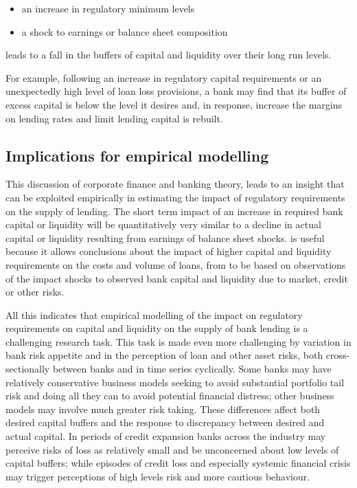 \documentclass[
]{article}
\begin{document}
\begin{itemize}
    \item an increase in regulatory minimum levels
    \item a shock to earnings or balance sheet composition
\end{itemize}

leads to a fall in the buffers of capital and liquidity over their long run levels.

For example, following an increase in regulatory capital requirements or an unexpectedly high level of loan loss provisions, a bank may find that its buffer of excess capital is below the level it desires and, in response, increase the margins on lending rates and limit lending capital is rebuilt.

\hypertarget{implications-for-empirical-modelling-1}{%
\subsection{Implications for empirical modelling}\label{implications-for-empirical-modelling-1}}

This discussion of corporate finance and banking theory, leads to an insight that can be exploited empirically in estimating the impact of regulatory requirements on the supply of lending. The short term impact of an increase in required bank capital or liquidity will be quantitatively very similar to a decline in actual capital or liquidity resulting from earnings of balance sheet shocks. is useful because it allows conclusions about the impact of higher capital and liquidity requirements on the costs and volume of loans, from to be based on observations of the impact shocks to observed bank capital and liquidity due to market, credit or other risks.

All this indicates that empirical modelling of the impact on regulatory requirements on capital and liquidity on the supply of bank lending is a challenging research task. This task is made even more challenging by variation in bank risk appetite and in the perception of loan and other asset risks, both cross-sectionally between banks and in time series cyclically. Some banks may have relatively conservative business models seeking to avoid substantial portfolio tail risk and doing all they can to avoid potential financial distress; other business models may involve much greater risk taking. These differences affect both desired capital buffers and the response to discrepancy between desired and actual capital. In periods of credit expansion banks across the industry may perceive risks of loss as relatively small and be unconcerned about low levels of capital buffers; while episodes of credit loss and especially systemic financial crisis may trigger perceptions of high levels risk and more cautious behaviour.
\end{document}
